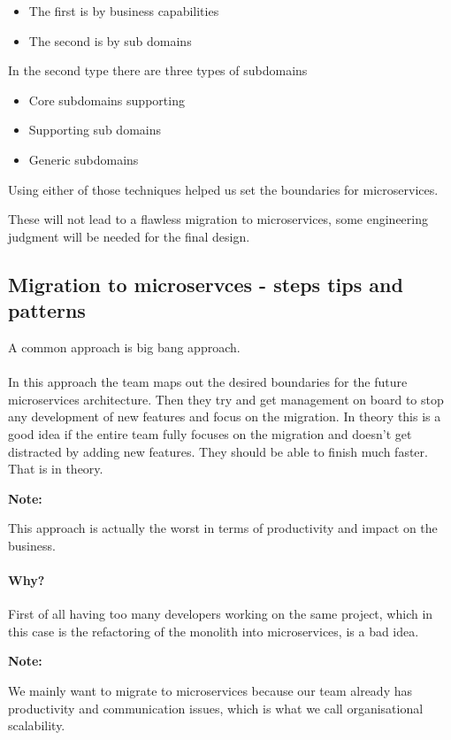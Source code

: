 \documentclass[a4paper, 11pt]{book}
\newenvironment{note}{
    \begin{siderule}
        \textbf{Note: }
        }{
    \end{siderule}}
\begin{document}
    \begin{itemize}
        \item The first is by business capabilities
        \item The second is by sub domains
    \end{itemize}
    In the second type there are three types of subdomains
    \begin{itemize}
        \item Core subdomains supporting
        \item Supporting sub domains
        \item Generic subdomains
    \end{itemize}

    Using either of those techniques helped us set the boundaries for microservices.

    These will not lead to a flawless migration to microservices, some engineering judgment will be needed for the final design.

    \subsection{Migration to microservces - steps tips and patterns}
    A common approach is big bang approach.

    \paragraph{}
    In this approach the team maps out the desired boundaries for the future microservices architecture.
    Then they try and get management on board to stop any development of new features and focus on the migration.
    In theory this is a good idea if the entire team fully focuses on the migration and doesn't get distracted by adding new features.
    They should be able to finish much faster.
    That is in theory.
    \begin{note}
        This approach is actually the worst in terms of productivity and impact on the business.
    \end{note}

    \paragraph{Why?}
    First of all having too many developers working on the same project, which in this case is the refactoring of the monolith into microservices, is a bad idea.

    \begin{note}
        We mainly want to migrate to microservices because our team already has productivity and communication issues, which is what we call organisational scalability.
    \end{note}
\end{document}
